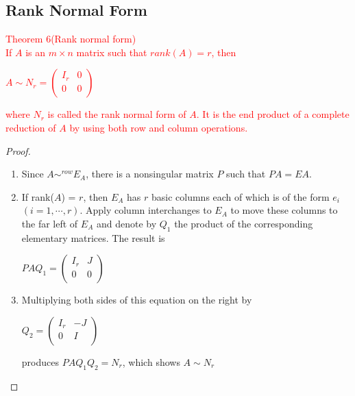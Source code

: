 \documentclass[UTF8,a4paper,11pt]{amsbook}
\begin{document}
\subsection{Rank Normal Form}
\textcolor{red}{Theorem 6(Rank normal form)\\
If $A$ is an $m\times n$ matrix such that $rank(A) = r$, then
\begin{center}
$A \sim N_r = 
\begin{pmatrix}
I_r & 0 \\
0 & 0 \\
\end{pmatrix}$
\end{center}
where $N_r$ is called the rank normal form of $A$. It is the end product of a complete reduction of $A$ by using both row and column operations.}
\begin{proof}
\begin{enumerate}
\item Since $A \sim ^{row} E_A$, there is a nonsingular matrix $P$ such that $PA = EA$.
\item If rank($A$) = $r$, then $E_A$ has $r$ basic columns each of which is of the form $e_i$ $(i = 1, \cdots , r)$. Apply column interchanges to $E_A$ to move these columns to the far left of $E_A$ and denote by $Q_1$ the product of the corresponding elementary matrices. The result is
\begin{center}
$PAQ_1=
\begin{pmatrix}
I_r & J \\
0 & 0 \\
\end{pmatrix}$
\end{center}
\item Multiplying both sides of this equation on the right by
\begin{center}
$Q_2=
\begin{pmatrix}
I_r & -J \\
0 & I \\
\end{pmatrix}$
\end{center}
produces $PAQ_1Q_2=N_r$, which shows $A\sim N_r$
\end{enumerate}
\end{proof}
\end{document}

